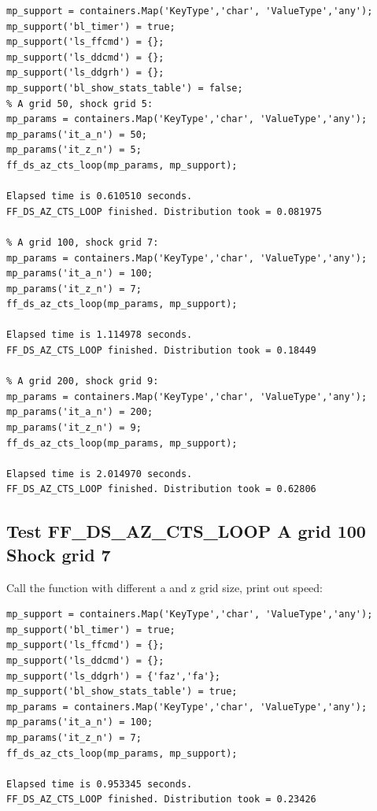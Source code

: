 \documentclass[
]{book}
\begin{document}
\begin{verbatim}
mp_support = containers.Map('KeyType','char', 'ValueType','any');
mp_support('bl_timer') = true;
mp_support('ls_ffcmd') = {};
mp_support('ls_ddcmd') = {};
mp_support('ls_ddgrh') = {};
mp_support('bl_show_stats_table') = false;
% A grid 50, shock grid 5:
mp_params = containers.Map('KeyType','char', 'ValueType','any');
mp_params('it_a_n') = 50;
mp_params('it_z_n') = 5;
ff_ds_az_cts_loop(mp_params, mp_support);

Elapsed time is 0.610510 seconds.
FF_DS_AZ_CTS_LOOP finished. Distribution took = 0.081975

% A grid 100, shock grid 7:
mp_params = containers.Map('KeyType','char', 'ValueType','any');
mp_params('it_a_n') = 100;
mp_params('it_z_n') = 7;
ff_ds_az_cts_loop(mp_params, mp_support);

Elapsed time is 1.114978 seconds.
FF_DS_AZ_CTS_LOOP finished. Distribution took = 0.18449

% A grid 200, shock grid 9:
mp_params = containers.Map('KeyType','char', 'ValueType','any');
mp_params('it_a_n') = 200;
mp_params('it_z_n') = 9;
ff_ds_az_cts_loop(mp_params, mp_support);

Elapsed time is 2.014970 seconds.
FF_DS_AZ_CTS_LOOP finished. Distribution took = 0.62806
\end{verbatim}

\hypertarget{test-ff_ds_az_cts_loop-a-grid-100-shock-grid-7}{%
\subsection{Test FF\_DS\_AZ\_CTS\_LOOP A grid 100 Shock grid 7}\label{test-ff_ds_az_cts_loop-a-grid-100-shock-grid-7}}

Call the function with different a and z grid size, print out speed:

\begin{verbatim}
mp_support = containers.Map('KeyType','char', 'ValueType','any');
mp_support('bl_timer') = true;
mp_support('ls_ffcmd') = {};
mp_support('ls_ddcmd') = {};
mp_support('ls_ddgrh') = {'faz','fa'};
mp_support('bl_show_stats_table') = true;
mp_params = containers.Map('KeyType','char', 'ValueType','any');
mp_params('it_a_n') = 100;
mp_params('it_z_n') = 7;
ff_ds_az_cts_loop(mp_params, mp_support);

Elapsed time is 0.953345 seconds.
FF_DS_AZ_CTS_LOOP finished. Distribution took = 0.23426
\end{verbatim}
\end{document}
